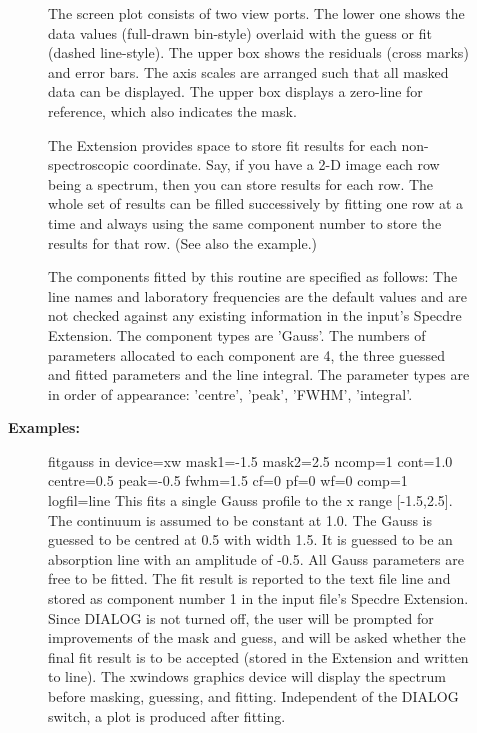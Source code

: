 \begin{description}
\begin{description}
\begin{terminalv}
   The screen plot consists of two view ports. The lower one shows the
   data values (full-drawn bin-style) overlaid with the guess or fit
   (dashed line-style). The upper box shows the residuals (cross
   marks) and error bars. The axis scales are arranged such that
   all masked data can be displayed. The upper box displays a
   zero-line for reference, which also indicates the mask.

   The Extension provides space to store fit results for each
   non-spectroscopic coordinate. Say, if you have a 2-D image each
   row being a spectrum, then you can store results for each row. The
   whole set of results can be filled successively by fitting one row
   at a time and always using the same component number to store the
   results for that row. (See also the example.)

   The components fitted by this routine are specified as follows:
   The line names and laboratory frequencies are the default values
   and are not checked against any existing information in the
   input's Specdre Extension. The component types are 'Gauss'. The
   numbers of parameters allocated to each component are 4, the
   three guessed and fitted parameters and the line integral. The
   parameter types are in order of appearance: 'centre', 'peak',
   'FWHM', 'integral'.

\end{terminalv}

\item [\textbf{Examples:}]
\begin{terminalv}
fitgauss in device=xw mask1=-1.5 mask2=2.5
      ncomp=1 cont=1.0 centre=0.5 peak=-0.5 fwhm=1.5 cf=0 pf=0 wf=0
      comp=1 logfil=line
   This fits a single Gauss profile to the x range [-1.5,2.5]. The
   continuum is assumed to be constant at 1.0. The Gauss is
   guessed to be centred at 0.5 with width 1.5. It is guessed to
   be an absorption line with an amplitude of -0.5.
   All Gauss parameters are free to be fitted. The fit result is
   reported to the text file line and stored as component
   number 1 in the input file's Specdre Extension.
   Since DIALOG is not turned off, the user will be prompted for
   improvements of the mask and guess, and will be asked whether
   the final fit result is to be accepted (stored in the Extension
   and written to line).
   The xwindows graphics device will display the spectrum before
   masking, guessing, and fitting. Independent of the DIALOG
   switch, a plot is produced after fitting.


\end{terminalv}
\end{description}
\end{description}
